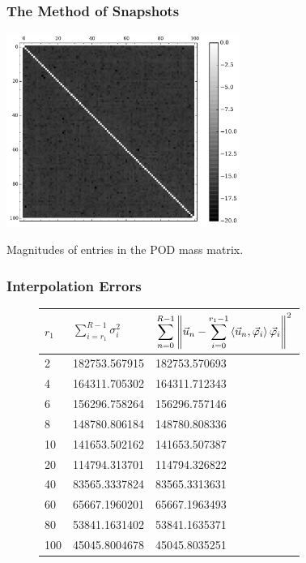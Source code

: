 \documentclass[mathserif]{beamer}
\begin{document}
\begin{frame}
    \frametitle{The Method of Snapshots}
    \begin{center}
        \includegraphics[width=3in]{../Pictures/POD/mass-matrix.pdf}

        Magnitudes of entries in the POD mass matrix.
    \end{center}
\end{frame}

\begin{frame}
    \frametitle{Interpolation Errors}
    \begin{figure}
        \centering
        \begin{tabular}{| l | l | l |}
            \hline
            \(r_1\) & \(\displaystyle \sum_{i = r_1}^{R - 1} \sigma_i^2\)
            & \(\displaystyle \sum_{n = 0}^{R - 1} \left\| \vec{u}_n - \sum_{i =
            0}^{r_1 - 1} \left\langle\vec{u}_n, \vec{\varphi}_i\right\rangle \vec{\varphi}_i \right\|^2\)
                                                                              \\
            \hline
             2       &  182753.567915   &    182753.570693                    \\
             4       &  164311.705302   &    164311.712343                    \\
             6       &  156296.758264   &    156296.757146                    \\
             8       &  148780.806184   &    148780.808336                    \\
             10      &  141653.502162   &    141653.507387                    \\
             20      &  114794.313701   &    114794.326822                    \\
             40      &  83565.3337824   &    83565.3313631                    \\
             60      &  65667.1960201   &    65667.1963493                    \\
             80      &  53841.1631402   &    53841.1635371                    \\
             100     &  45045.8004678   &    45045.8035251                    \\
            \hline
        \end{tabular}
    \end{figure}
\end{frame}
\end{document}

